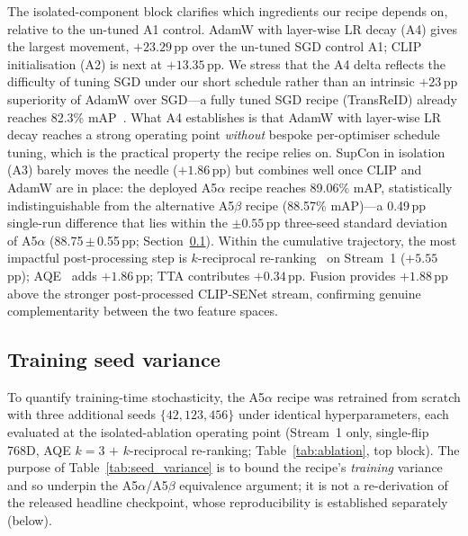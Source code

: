 \documentclass[10pt,a4paper]{article}
\begin{document}
The isolated-component block clarifies which ingredients our recipe depends on,
relative to the un-tuned A1 control. AdamW with layer-wise LR decay (A4) gives
the largest movement, $+23.29$\,pp over the un-tuned SGD control A1; CLIP
initialisation (A2) is next at $+13.35$\,pp. We stress that the A4 delta
reflects the difficulty of tuning SGD under our short schedule rather than an
intrinsic $+23$\,pp superiority of AdamW over SGD---a fully tuned SGD recipe
(TransReID) already reaches 82.3\% mAP~\cite{he2021transreid}. What A4
establishes is that AdamW with layer-wise LR decay reaches a strong operating
point \emph{without} bespoke per-optimiser schedule tuning, which is the
practical property the recipe relies on. SupCon in isolation (A3) barely moves
the needle ($+1.86$\,pp) but combines well once CLIP and AdamW are in place:
the deployed A5$\alpha$ recipe reaches 89.06\% mAP, statistically
indistinguishable from the alternative A5$\beta$ recipe (88.57\% mAP)---a
0.49\,pp single-run difference that lies within the $\pm 0.55$\,pp three-seed
standard deviation of A5$\alpha$ (88.75\,$\pm$\,0.55\,pp;
Section~\ref{sec:seed_variance}). Within the cumulative trajectory, the most
impactful post-processing step is $k$-reciprocal
re-ranking~\cite{zhong2017rerank} on Stream~1 ($+5.55$\,pp);
AQE~\cite{arandjelovic2012aqe} adds $+1.86$\,pp; TTA contributes $+0.34$\,pp.
Fusion provides $+1.88$\,pp above the stronger post-processed CLIP-SENet
stream, confirming genuine complementarity between the two feature spaces.

\subsection{Training seed variance}
\label{sec:seed_variance}
To quantify training-time stochasticity, the A5$\alpha$ recipe was retrained
from scratch with three additional seeds $\{42, 123, 456\}$ under identical
hyperparameters, each evaluated at the isolated-ablation operating point
(Stream~1 only, single-flip 768D, AQE $k{=}3$ $+$ $k$-reciprocal re-ranking;
Table~\ref{tab:ablation}, top block). The purpose of
Table~\ref{tab:seed_variance} is to bound the recipe's \emph{training} variance
and so underpin the A5$\alpha$/A5$\beta$ equivalence argument; it is not a
re-derivation of the released headline checkpoint, whose reproducibility is
established separately (below).
\end{document}
